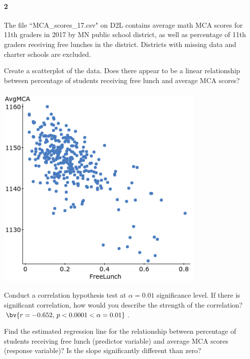 \documentclass{article}
\begin{document}
\begin{flushleft}
\paragraph{2} The file ``MCA\_scores\_17.csv" on D2L contains average math MCA scores for 11th graders in 2017 by MN public school district, as well as percentage of 11th graders receiving free lunches in the district. Districts with missing data and charter schools are excluded.
\begin{enumalpha}
\item Create a scatterplot of the data. Does there appear to be a linear relationship between percentage of students receiving free lunch and average MCA scores?\\
\medskip
{}\\
\medskip
\includegraphics[width=4in]{images/grp10_Q3_a}
\vspace{.5in}
\item Conduct a correlation hypothesis test at $\alpha = 0.01$ significance level. If there is significant correlation, how would you describe the strength of the correlation?\\
\medskip
$\bv{r = -0.652, \, p <0.0001 < \alpha = 0.01}$. 
\newpage
\item Find the estimated regression line for the relationship between percentage of students receiving free lunch (predictor variable) and average MCA scores (response variable)? Is the slope significantly different than zero?\\

\end{enumalpha}
\end{flushleft}
\end{document}
